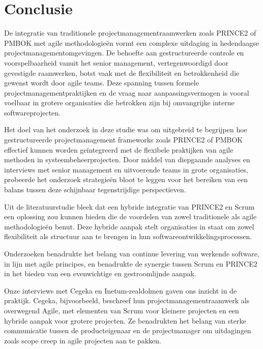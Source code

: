 \documentclass[dutch]{hogent-article}
\begin{document}
\section{Conclusie}%
\label{sec:conclusie}
De integratie van traditionele projectmanagementraamwerken zoals PRINCE2 of PMBOK met agile methodologieën vormt een complexe uitdaging in hedendaagse projectmanagementomgevingen. De behoefte aan gestructureerde controle en voorspelbaarheid vanuit het senior management, vertegenwoordigd door gevestigde raamwerken, botst vaak met de flexibiliteit en betrokkenheid die gewenst wordt door agile teams. Deze spanning tussen formele projectmanagementpraktijken en de vraag naar aanpassingsvermogen is vooral voelbaar in grotere organisaties die betrokken zijn bij omvangrijke interne softwareprojecten.
\newline

Het doel van het onderzoek in deze studie was om uitgebreid te begrijpen hoe gestructureerde projectmanagement frameworks zoals PRINCE2 of PMBOK effectief kunnen worden geïntegreerd met de flexibele praktijken van agile methoden in systeembeheerprojecten. Door middel van diepgaande analyses en interviews met senior management en uitvoerende teams in grote organisaties, probeerde het onderzoek strategieën bloot te leggen voor het bereiken van een balans tussen deze schijnbaar tegenstrijdige perspectieven.
\newline

Uit de literatuurstudie bleek dat een hybride integratie van PRINCE2 en Scrum een oplossing zou kunnen bieden die de voordelen van zowel traditionele als agile methodologieën benut. Deze hybride aanpak stelt organisaties in staat om zowel flexibiliteit als structuur aan te brengen in hun softwareontwikkelingsprocessen. 
\newline

Onderzoeken benadrukte het belang van continue levering van werkende software, in lijn met agile principes, en benadrukte de synergie tussen Scrum en PRINCE2 in het bieden van een evenwichtige en gestroomlijnde aanpak.
\newline

Onze interviews met Cegeka en Inetum-realdolmen gaven ons inzicht in de praktijk. Cegeka, bijvoorbeeld, beschreef hun projectmanagementraamwerk als overwegend Agile, met elementen van Scrum voor kleinere projecten en een hybride aanpak voor grotere projecten. Ze benadrukten het belang van sterke communicatie tussen de producteigenaar en de projectmanager om uitdagingen zoals scope creep in agile projecten aan te pakken.
\newline
\end{document}
